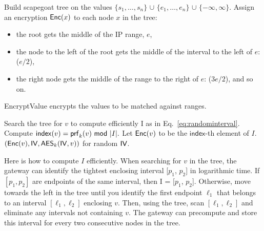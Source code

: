 \begin{framed}
\begin{algorithmic}[1]

  \State Build scapegoat tree on the values 
              $\{s_1, \dots, s_n\}$ 
              $\cup$ $\{e_1, \dots, e_n\}$ 
              $\cup$ $\{-\infty, \infty\}$.
  \State Assign an encryption $\mathsf{Enc}(x)$ to each node $x$ in the tree:
  \begin{itemize}
  \item the root gets the middle of the IP range, $e$, 
  \item the node to the left of the root gets the middle of the interval to the left of $e$: ($e/2$),
  \item the right node gets the middle of the range
  to the right of $e$: ($3e/2$), and so on.
  \end{itemize}

  \State {}
\EndProcedure

\end{algorithmic}
\end{framed}



EncryptValue encrypts the values to be matched against ranges.

\begin{framed}
\begin{algorithmic}[1]

  \State Search the tree for $v$ to compute efficiently I as in Eq.~\ref{eq:randominterval}.
  \State Compute $\mathsf{index}(v) = \prf_k(v)\ \mod\ |I|.$ 
  \State Let $\mathsf{Enc}(v)$ to be the $\mathsf{index}$-th element of $I$. 
  \State \Return $\left(\mathsf{Enc}(v), \mathsf{IV}, \mathsf{AES}_k(\mathsf{IV}, v)\right)$ for random $\mathsf{IV}$. 
\EndProcedure

\end{algorithmic}
\end{framed}

Here is how to compute $I$ efficiently. When searching for $v$ in the tree, the gateway
can identify the tightest enclosing interval [$p_1$, $p_2$] in logarithmic time. 
 If $[p_1, p_2]$ are endpoints of the
same interval, then I = [$p_1$, $p_2$]. Otherwise, move towards the left in the tree until you identify the first endpoint
$\ell_1$
that belongs to an interval $[\ell_1, \ell_2]$ enclosing $v$. Then, using the tree, scan $[\ell_1, \ell_2]$ and eliminate
any intervals not containing $v$. The gateway can precompute and store this interval for every two consecutive nodes in the tree.

